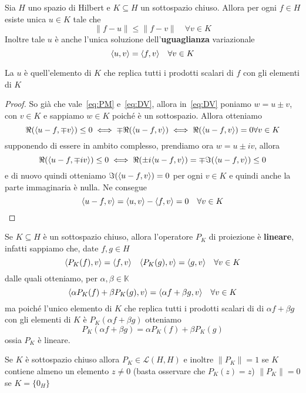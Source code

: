 \begin{theorem}\label{thm:proiezioni_sottospazi}
    Sia \(H\) uno spazio di Hilbert e \(K \subseteq H \) un sottospazio chiuso.
    Allora per ogni \(f \in H\) esiste unica \(u \in K\) tale che 
    \[
      \| f- u\|\le \|f - v\| \quad \forall v \in K
    \]
    Inoltre tale \(u\) è anche l'unica soluzione dell'\textbf{uguaglianza}
    variazionale
    \begin{equation}\label{eq:UV}
        {\left\langle u, v\right\rangle} = {\left\langle f, v\right\rangle} \quad \forall v \in K
    \end{equation}
\end{theorem}
\begin{remark}
    La \(u\) è quell'elemento di \(K\) che replica tutti i prodotti scalari di
    \(f\) con gli elementi di \(K\) 
\end{remark}
\begin{proof}
    So già che vale~\eqref{eq:PM} e~\eqref{eq:DV}, allora in~\eqref{eq:DV}
    poniamo \(w = u \pm v\), con \(v \in K\) e sappiamo \(w \in K\) poiché è un
    sottospazio. Allora otteniamo
    \[
      \Re{({\left\langle u -f, \mp v\right\rangle} )} \le 0 \iff \mp \Re {({\left\langle u-f, v\right\rangle} )} \iff
      \Re{({\left\langle u- f, v\right\rangle} )} = 0 \forall v \in K
    \]
    supponendo di essere in ambito complesso, prendiamo ora \(w = u \pm iv\),
    allora
    \[
        \Re{({\left\langle u-f, \mp iv\right\rangle} )} \le 0 \iff \Re{(\pm i{\left\langle u-f, v\right\rangle} )} =
        \mp \Im{({\left\langle u-f, v\right\rangle} )} \le 0
    \]
    e di nuovo quindi otteniamo \(\Im{({\left\langle u-f, v\right\rangle} )} = 0\) per ogni \(v \in
    K\) e quindi anche la parte immaginaria è nulla. Ne consegue
    \[
      {\left\langle u-f,v\right\rangle} = {\left\langle u,v\right\rangle}  -{\left\langle f, v\right\rangle}  = 0 \quad \forall v \in K 
    \]
\end{proof}
\begin{remark}
    Se \(K \subseteq H \) è un sottospazio chiuso, allora l'operatore \(P_K\) di
    proiezione è \textbf{lineare}, infatti sappiamo che, date \(f, g \in H\) 
    \[
      {\left\langle P_K{(f)},v\right\rangle} = {\left\langle f, v\right\rangle} \quad {\left\langle P_K{(g)}, v\right\rangle} = {\left\langle g, v\right\rangle}
      \quad \forall v \in K
    \]
    dalle quali otteniamo, per \(\alpha, \beta \in \mathbb{K}\) 
    \[
        {\left\langle\alpha P_K{(f)} + \beta P_K{(g)}, v\right\rangle} = {\left\langle\alpha f + \beta g,
        v\right\rangle} \quad \forall v \in K
    \]
    ma poiché l'unico elemento di \(K\) che replica tutti i prodotti scalari di
    di \(\alpha f + \beta g\) con gli elementi di \(K\) è \(P_K{(\alpha f +
    \beta g)}\) otteniamo 
    \[
        P_K{(\alpha f + \beta g)} = \alpha P_K{(f)} + \beta P_K{(g)}
    \]
    ossia \(P_K\) è lineare.
\end{remark}
\begin{remark}
    Se \(K\) è sottospazio chiuso allora \(P_K \in \mathcal{L}{(H, H)} \) e
    inoltre \(\|P_K\| = 1\) se \(K\) contiene almeno un elemento \(z \neq 0\)
    (basta osservare che \(P_K{(z)} = z\)) \(\|P_K\| = 0\) se \(K = \{0_H\} \) 
\end{remark}

